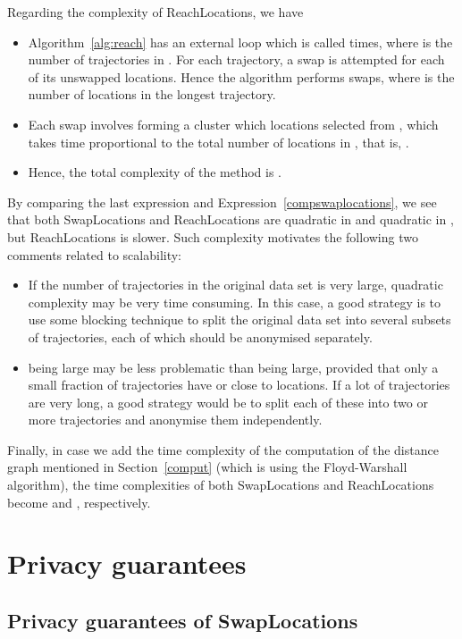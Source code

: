 Regarding the complexity of ReachLocations, we have
\begin{itemize}
\item Algorithm~\ref{alg:reach} has an external loop
which is called  times, where  is the number
of trajectories in . For each trajectory,
a swap is attempted for each of its unswapped locations.
Hence the algorithm performs  swaps,
where  is the number of locations in the longest
trajectory.
\item Each swap involves forming a cluster which  locations
selected from ,
which takes time
proportional to the total number of locations in ,
that is, .
\item Hence, the total complexity of the method is .
\end{itemize}

By comparing the last expression and Expression~\ref{compswaplocations},
we see that both SwapLocations and ReachLocations are quadratic in
 and quadratic in , but ReachLocations is slower.
Such complexity motivates the following two comments
related to scalability:
\begin{itemize}
\item If the number of trajectories  in the original data set is very large,
quadratic complexity may be very time consuming. In this case, a good
strategy is to use some blocking technique to split the original data set
into several subsets of trajectories, each of which should be anonymised
separately.
\item  being large may be less problematic than  being large,
provided that only a small fraction of trajectories have  or close
to  locations. If a lot of trajectories are very long, a good
strategy would be to split each of these into two or more trajectories and anonymise them independently.
\end{itemize}

Finally, in case we add the time complexity of the computation of the
distance graph mentioned in Section~\ref{comput} (which
is  using the Floyd-Warshall algorithm), the time complexities
of both SwapLocations and ReachLocations become
 and , respectively.

\section{Privacy guarantees}
\label{sec:guarantees}

\subsection{Privacy guarantees of SwapLocations}
\label{sec:guaranteesswaploc}


